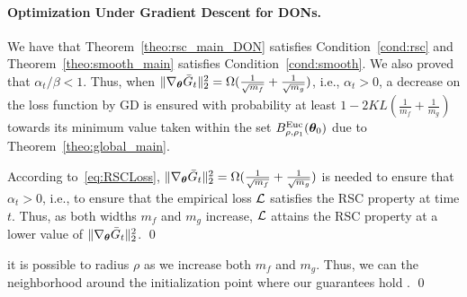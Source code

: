 %
\paragraph{\textbf{Optimization Under Gradient Descent for DONs.}} We have that Theorem~\ref{theo:rsc_main_DON} satisfies Condition~\ref{cond:rsc} and Theorem~\ref{theo:smooth_main} satisfies Condition~\ref{cond:smooth}. We also proved that $\alpha_t/\beta<1$. Thus, when $\| \nabla_{{\bm{\theta}}} \bar{G}_t \|_2^2 = \Omega(\frac{1}{\sqrt{m_f}}+\frac{1}{\sqrt{m_g}})$, i.e., $\alpha_t>0$, a decrease on the loss function by GD is ensured with probability at least $1-2KL(\frac{1}{m_f}+\frac{1}{m_g})$ towards its minimum value taken within the set $B^{\mathrm{Euc}}_{\rho,\rho_1}({\bm{\theta}}_0)$ due to Theorem~\ref{theo:global_main}.

\begin{remark}
According to~\eqref{eq:RSCLoss}, $\| \nabla_{{\bm{\theta}}} \bar{G}_t \|_2^2 = \Omega(\frac{1}{\sqrt{m_f}}+\frac{1}{\sqrt{m_g}})$ is needed to ensure that $\alpha_t>0$, i.e., to ensure that the empirical loss ${\mathcal{L}}$ satisfies the RSC property at time $t$. Thus, as both widths $m_f$ and $m_g$ increase, ${\mathcal{L}}$ attains the RSC property at a lower value of $\| \nabla_{{\bm{\theta}}} \bar{G}_t \|_2^2$.
%
%
%
%
%
%
  \qed
  \label{rem:RSC-m}
\end{remark}
%
\begin{remark}
%
%
%
%
%
\pcedit{The condition $\sigma_0\leq 1-\rho\max\{\frac{1}{\sqrt{m_f}},\frac{1}{\sqrt{m_g}}\}$ (required for obtaining a polynomial dependence on $L$ for both RSC and smoothness parameters) implies %
%
$\rho\leq\min\{m_f,m_g\}$ since $\sigma_0$ must be positive.}
%
%
 it is possible to  %
radius $\rho$ %
as we increase 
both $m_f$ and $m_g$. 
%
Thus, we can 
the neighborhood around the initialization point where our guarantees hold .
%
\label{rem:largerNeighb-m}\qed
\end{remark}